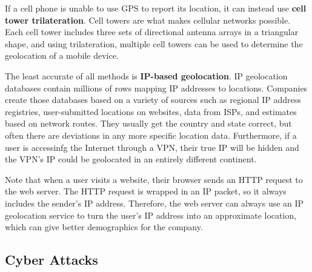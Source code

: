 \documentclass{article}
\begin{document}
  If a cell phone is unable to use GPS to report its location, it can instead use \textbf{cell tower trilateration}. Cell towers are what makes cellular networks possible. Each cell tower includes three sets of directional antenna arrays in a triangular shape, and using trilateration, multiple cell towers can be used to determine the geolocation of a mobile device. 

  The least accurate of all methods is \textbf{IP-based geolocation}. IP geolocation databases contain millions of rows mapping IP addresses to locations. Companies create those databases based on a variety of sources such as regional IP address registries, user-submitted locations on websites, data from ISPs, and estimates based on network routes. They usually get the country and state correct, but often there are deviations in any more specific location data. Furthermore, if a user is accessinfg the Internet through a VPN, their true IP will be hidden and the VPN's IP could be geolocated in an entirely different continent. 

  Note that when a user visits a website, their browser sends an HTTP request to the web server. The HTTP request is wrapped in an IP packet, so it always includes the sender's IP address. Therefore, the web server can always use an IP geolocation service to turn the user's IP address into an approximate location, which can give better demographics for the company. 

  \subsection{Cyber Attacks}
\end{document}
